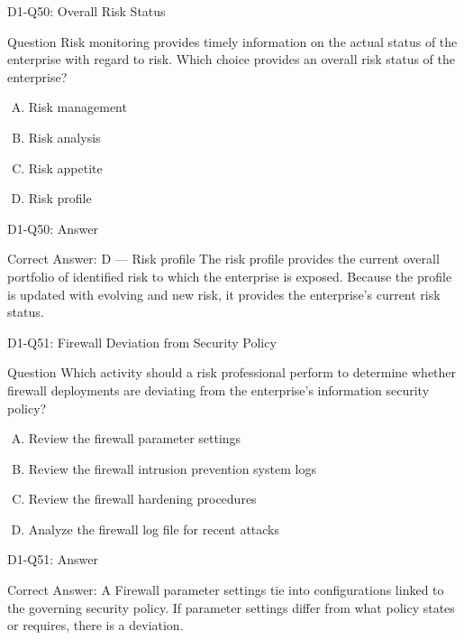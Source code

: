 \documentclass{beamer}
\begin{document}
	\begin{frame}{D1-Q50: Overall Risk Status}
		\begin{block}{Question}
			Risk monitoring provides timely information on the actual status of the enterprise with regard to risk. Which choice provides an overall risk status of the enterprise?
		\end{block}
		\begin{enumerate}[(A)]
			\item Risk management
			\item Risk analysis
			\item Risk appetite
			\item Risk profile
		\end{enumerate}
	\end{frame}
	\begin{frame}{D1-Q50: Answer}
		\begin{block}{Correct Answer: D --- Risk profile}
			The risk profile provides the current overall portfolio of identified risk to which the enterprise is exposed. Because the profile is updated with evolving and new risk, it provides the enterprise's current risk status.
		\end{block}
	\end{frame}
	
	\begin{frame}{D1-Q51: Firewall Deviation from Security Policy}
		\begin{block}{Question}
			Which activity should a risk professional perform to determine whether firewall deployments are deviating from the enterprise's information security policy?
		\end{block}
		\begin{enumerate}[(A)]
			\item Review the firewall parameter settings
			\item Review the firewall intrusion prevention system logs
			\item Review the firewall hardening procedures
			\item Analyze the firewall log file for recent attacks
		\end{enumerate}
	\end{frame}
	\begin{frame}{D1-Q51: Answer}
		\begin{block}{Correct Answer: A}
			Firewall parameter settings tie into configurations linked to the governing security policy. If parameter settings differ from what policy states or requires, there is a deviation.
		\end{block}
	\end{frame}
	
\end{document}
